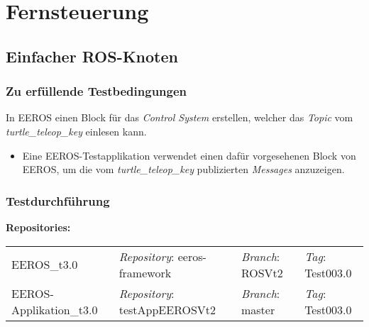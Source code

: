 \section{Fernsteuerung}
\subsection{Einfacher ROS-Knoten}
\subsubsection{Zu erfüllende Testbedingungen}
In EEROS einen Block für das \textit{Control System} erstellen, welcher das \textit{Topic} vom \textit{turtle\_teleop\_key} einlesen kann.
\begin{itemize}
\item Eine EEROS-Testapplikation verwendet einen dafür vorgesehenen Block von EEROS, um die vom \textit{turtle\_teleop\_key} publizierten \textit{Messages} anzuzeigen.
\end{itemize}

\subsubsection{Testdurchführung}
\textbf{Repositories:} \\
\begin{tabular}
  { l						| l			 							l								 l								}

  EEROS\_t3.0				& \textit{Repository}: eeros-framework	& \textit{Branch}: ROSVt2		& \textit{Tag}: Test003.0 		\\
  EEROS-Applikation\_t3.0	& \textit{Repository}: testAppEEROSVt2	& \textit{Branch}: master		& \textit{Tag}: Test003.0 		\\
\end{tabular}


